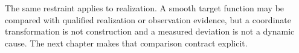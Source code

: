 The same restraint applies to realization. A smooth target function may be
compared with qualified realization or observation evidence, but a coordinate
transformation is not construction and a measured deviation is not a dynamic
cause. The next chapter makes that comparison contract explicit.

\label{prop:spectral-smoothing}
\label{princ:realization-survival}
\label{def:runtime-smoothness}
